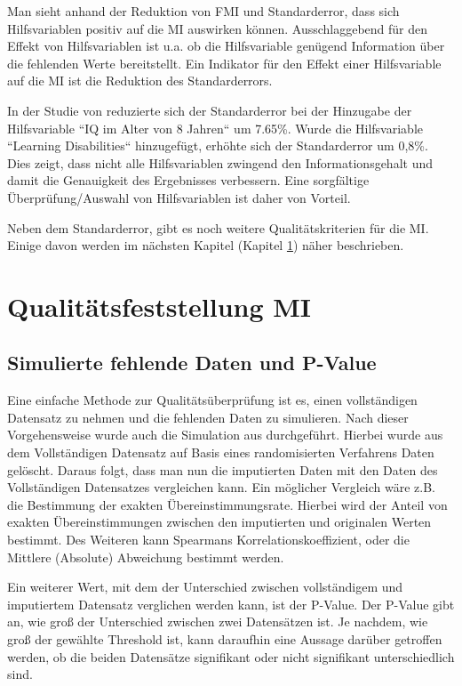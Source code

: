 Man sieht anhand der Reduktion von FMI und Standarderror, dass sich Hilfsvariablen positiv auf die MI auswirken können. Ausschlaggebend für den Effekt von Hilfsvariablen
ist u.a. ob die Hilfsvariable genügend Information über die fehlenden Werte bereitstellt. \autocite[1302]{Hughes2019} Ein Indikator für den Effekt einer Hilfsvariable auf 
die MI ist die Reduktion des Standarderrors. 

In der Studie von \textcite[]{Madley-Dowd2019} 
reduzierte sich der Standarderror bei der Hinzugabe der Hilfsvariable 
``IQ im Alter von 8 Jahren`` um 7.65\%. Wurde die Hilfsvariable ``Learning Disabilities``  hinzugefügt, erhöhte sich der Standarderror um 0,8\%. \autocite[71]{Madley-Dowd2019} 
Dies zeigt, dass nicht alle Hilfsvariablen zwingend den Informationsgehalt und damit die Genauigkeit des Ergebnisses verbessern. 
Eine sorgfältige Überprüfung/Auswahl von Hilfsvariablen ist daher von Vorteil. 

Neben dem Standarderror, gibt es noch weitere Qualitätskriterien für die MI. Einige davon werden im nächsten Kapitel
(Kapitel \ref{section:qualtity}) näher beschrieben.


\section{Qualitätsfeststellung MI}
\label{section:qualtity}

\subsection{Simulierte fehlende Daten und P-Value}

Eine einfache Methode zur Qualitätsüberprüfung ist es, einen vollständigen Datensatz zu nehmen und die fehlenden Daten zu 
simulieren. Nach dieser Vorgehensweise wurde auch die Simulation aus \textcite[]{Young-Saver2018} durchgeführt. Hierbei wurde 
aus dem Vollständigen Datensatz auf Basis eines randomisierten Verfahrens Daten gelöscht. Daraus folgt, dass man nun die 
imputierten Daten mit den Daten des Vollständigen Datensatzes vergleichen kann. Ein möglicher Vergleich wäre z.B. die 
Bestimmung der exakten Übereinstimmungsrate. Hierbei wird der Anteil von exakten Übereinstimmungen zwischen den imputierten 
und originalen Werten bestimmt. Des Weiteren kann Spearmans Korrelationskoeffizient, oder die Mittlere (Absolute) Abweichung 
bestimmt werden. \autocite[3664]{Young-Saver2018} 

Ein weiterer Wert, mit dem der Unterschied zwischen vollständigem und imputiertem Datensatz verglichen werden kann, ist der P-Value.
Der P-Value gibt an, wie groß der Unterschied zwischen zwei Datensätzen ist. Je nachdem, wie groß der gewählte Threshold ist,
kann daraufhin eine Aussage darüber getroffen werden, ob die beiden Datensätze signifikant oder nicht signifikant unterschiedlich
sind. 

